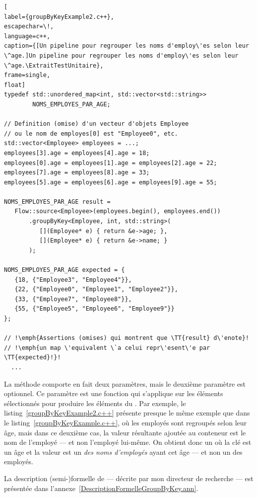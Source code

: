 \begin{lstlisting}[
label={groupByKeyExample2.c++},
escapechar=\!,
language=c++,
caption={[Un pipeline pour regrouper les noms d'employ\'es selon leur \^age.]Un pipeline pour regrouper les noms d'employ\'es selon leur \^age.\ExtraitTestUnitaire},
frame=single,
float]
typedef std::unordered_map<int, std::vector<std::string>> 
        NOMS_EMPLOYES_PAR_AGE;

// Definition (omise) d'un vecteur d'objets Employee 
// ou le nom de employes[0] est "Employee0", etc.
std::vector<Employee> employees = ...; 
employees[3].age = employees[4].age = 18;
employees[0].age = employees[1].age = employees[2].age = 22;
employees[7].age = employees[8].age = 33;
employees[5].age = employees[6].age = employees[9].age = 55;

NOMS_EMPLOYES_PAR_AGE result = 
   Flow::source<Employee>(employees.begin(), employees.end())
       .groupByKey<Employee, int, std::string>(
          [](Employee* e) { return &e->age; },
          [](Employee* e) { return &e->name; }
       );
    
NOMS_EMPLOYES_PAR_AGE expected = {
   {18, {"Employee3", "Employee4"}},
   {22, {"Employee0", "Employee1", "Employee2"}},
   {33, {"Employee7", "Employee8"}},
   {55, {"Employee5", "Employee6", "Employee9"}}
};

// !\emph{Assertions (omises) qui montrent que \TT{result} d\'enote}!
// !\emph{un map \'equivalent \`a celui repr\'esent\'e par \TT{expected}!}!
  ...
\end{lstlisting}


La m\'ethode  comporte en fait deux param\`etres, mais le deuxi\`eme param\`etre est optionnel. Ce param\`etre est une fonction qui s'applique sur les \'el\'ements s\'electionn\'es pour produire les \'el\'ements du . Par exemple,  le listing~\ref{groupByKeyExample2.c++} pr\'esente presque le m\^eme exemple que dans le listing~\ref{groupByKeyExample.c++}, o\`u les employ\'es sont regroup\'es selon leur \^age, mais dans ce deuxi\`eme cas, la valeur r\'esultante ajout\'ee au conteneur est le nom de l'employ\'e --- et non l'employ\'e lui-m\^eme. On obtient donc un  o\`u la cl\'e est un \^age et la valeur est un  \emph{des noms d'employ\'es} ayant cet \^age --- et non un  des employ\'es.


La description (semi-)formelle de  --- d\'ecrite par mon directeur de recherche --- est pr\'esent\'ee dans l'annexe~\ref{DescriptionFormelleGroupByKey.ann}.




